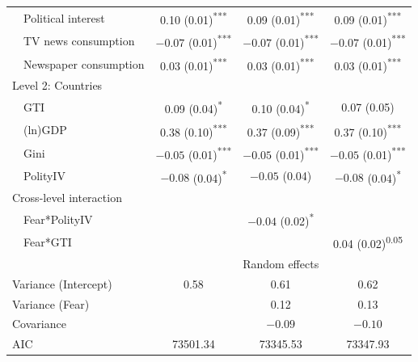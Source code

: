 \begin{table}[H]
{\begin{tabular}{llccc}
            & Political interest            & 0.10 (0.01)\textsuperscript{***}   & 0.09 (0.01)\textsuperscript{***}   & 0.09 (0.01)\textsuperscript{***}   \\
            & TV news consumption           & $-0.07$ (0.01)\textsuperscript{***}  & $-0.07$ (0.01)\textsuperscript{***}  & $-0.07$ (0.01)\textsuperscript{***}  \\
            & Newspaper consumption         & 0.03 (0.01)\textsuperscript{***}   & 0.03 (0.01)\textsuperscript{***}   & 0.03 (0.01)\textsuperscript{***}   \\
\multicolumn{2}{l}{Level 2: Countries}      &                 &                 &                 \\
            & GTI                           & 0.09 (0.04)\textsuperscript{*}     & 0.10 (0.04)\textsuperscript{*}     & 0.07 (0.05)     \\
            & (ln)GDP                       & 0.38 (0.10)\textsuperscript{***}   & 0.37 (0.09)\textsuperscript{***}   & 0.37 (0.10)\textsuperscript{***}   \\
            & Gini                          & $-0.05$ (0.01)\textsuperscript{***}  & $-0.05$ (0.01)\textsuperscript{***}  & $-0.05$ (0.01)\textsuperscript{***}  \\
            & PolityIV                      & $-0.08$ (0.04)\textsuperscript{*}    & $-0.05$ (0.04)    & $-0.08$ (0.04)\textsuperscript{*}    \\
\multicolumn{2}{l}{Cross-level interaction} &                 &                 &                 \\
            & Fear*PolityIV                 &                 & $-0.04$ (0.02)\textsuperscript{*}    &                 \\
            & Fear*GTI                      &                 &                 & 0.04 (0.02)\textsuperscript{0.05}  \\ \cline{3-5} 
\multicolumn{2}{l}{}                        & \multicolumn{3}{c}{Random effects}                  \\ \cline{3-5} 
\multicolumn{2}{l}{Variance (Intercept)}    & 0.58            & 0.61            & 0.62            \\
\multicolumn{2}{l}{Variance (Fear)}         &                 & 0.12            & 0.13            \\
\multicolumn{2}{l}{Covariance}              &                 & $-0.09$           & $-0.10$           \\
\multicolumn{2}{l}{AIC}                     & 73501.34        & 73345.53        & 73347.93        \\

\end{tabular}}
\end{table}
